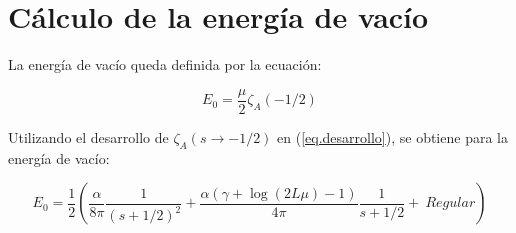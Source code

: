 \begin{comment}
\begin{equation}
\frac{1 }{2 \pi i}
\int _{circulo} \lambda ^{-2s } \partial \lambda \ Ln \left[
					\frac{e ^{\frac{i \alpha  \log ( 2 \lambda L )}{2 \lambda}} e ^{2 i \lambda L} S1}
					{\Gamma \left( 1 - \frac{i \alpha}{2 \lambda} \right)} - 
					\frac{e ^{\frac{-i \alpha  \log (2 \lambda L )}{2 \lambda}} S2}
					{\Gamma \left( 1 + \frac{i \alpha}{2 \lambda} \right)}					
					\right] d \lambda
\end{equation}
\end{comment}


\section{Cálculo de la energía de vacío}

La energía de vacío queda definida por la ecuación: 

\begin{equation}
    E _0 = \frac{\mu }{2}  
    \zeta _A \left( - 1/2 \right) 
\end{equation}

Utilizando el desarrollo de $\zeta _A (s \rightarrow -1/2)$ en (\ref{eq.desarrollo}), se obtiene para la energía de vacío:

\begin{equation}
E _0 = \frac{1}{2} \left(
				\frac{\alpha}{8 \pi  } \frac{1}{(s+1/2)^2} + 
				\frac{\alpha ( \gamma  +  \log (2L \mu ) -1 )}{4 \pi  } \frac{1}{s+1/2} +
				\ Regular
				\right)
\end{equation}

 
